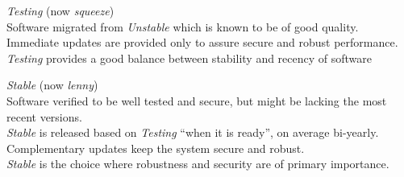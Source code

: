 \documentclass[letterpaper,landscape]{report}
\begin{document}
\begin{multicols}{3}
\begin{description}[nolistsep,leftmargin=1pc,topsep=1em]
\item[``Always-ready-to-release'']  \emph{Testing} (now \emph{squeeze})\\
  Software migrated from \emph{Unstable} which is known to be of good
  quality.  Immediate updates are provided only
  to assure secure and robust performance. \\
  \emph{Testing} provides a good balance between stability and recency
  of software

\item[Official release]\hfill\emph{Stable} (now \emph{lenny})\\
  Software verified to be well tested and secure,
  but might be lacking the most recent versions.\\%
  \emph{Stable} is released based on \emph{Testing} ``when it is
  ready'', on average bi-yearly.  Complementary updates keep the
  system secure and robust.\\
  \emph{Stable} is the choice where robustness and security are of
  primary importance.
\end{description}

\end{multicols}
\end{document}
